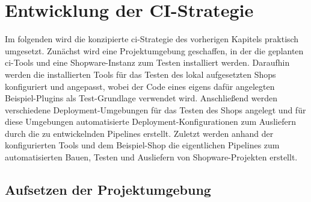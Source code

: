 
\section{Entwicklung der CI-Strategie} \label{sec:04-implementation}

Im folgenden wird die konzipierte \acrshort{ci}-Strategie des vorherigen Kapitels praktisch umgesetzt.
Zunächst wird eine Projektumgebung geschaffen, in der die geplanten \acrshort{ci}-Tools und eine Shopware-Instanz zum
Testen installiert werden.
Daraufhin werden die installierten Tools für das Testen des lokal aufgesetzten Shops konfiguriert und angepasst,
wobei der Code eines eigens dafür angelegten Beispiel-Plugins als Test-Grundlage verwendet wird.
Anschließend werden verschiedene Deployment-Umgebungen für das Testen des Shops angelegt und für diese Umgebungen
automatisierte Deployment-Konfigurationen zum Ausliefern durch die zu entwickelnden Pipelines erstellt.
Zuletzt werden anhand der konfigurierten Tools und dem Beispiel-Shop die eigentlichen Pipelines zum
automatisierten Bauen, Testen und Ausliefern von Shopware-Projekten erstellt.

\subsection{Aufsetzen der Projektumgebung} \label{subsec:04-implementation-1}

